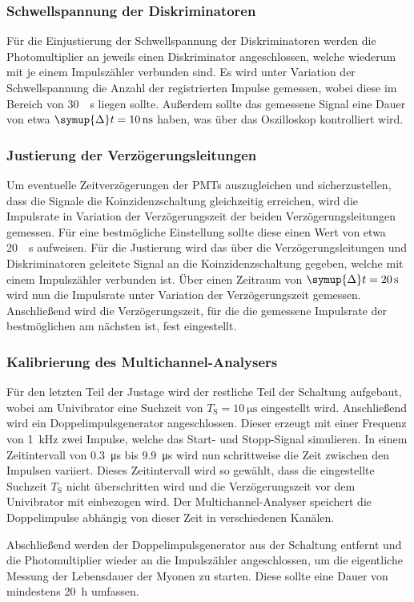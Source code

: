 \subsubsection{Schwellspannung der Diskriminatoren}

Für die Einjustierung der Schwellspannung der Diskriminatoren werden die Photomultiplier an jeweils einen Diskriminator angeschlossen,
welche wiederum mit je einem Impulszähler verbunden sind.
Es wird unter Variation der Schwellspannung die Anzahl der registrierten Impulse gemessen,
wobei diese im Bereich von \SI[per-mode=reciprocal]{30}{\per\second} liegen sollte.
Außerdem sollte das gemessene Signal eine Dauer von etwa $\symup{\Delta}t = \SI{10}{\nano\second}$ haben,
was über das Oszilloskop kontrolliert wird.


\subsubsection{Justierung der Verzögerungsleitungen}

Um eventuelle Zeitverzögerungen der \acp{PMT} auszugleichen und sicherzustellen,
dass die Signale die Koinzidenzschaltung gleichzeitig erreichen,
wird die Impulsrate in Variation der Verzögerungszeit der beiden Verzögerungsleitungen gemessen.
Für eine bestmögliche Einstellung sollte diese einen Wert von etwa \SI[per-mode=reciprocal]{20}{\per\second} aufweisen.
Für die Justierung wird das über die Verzögerungsleitungen und Diskriminatoren geleitete Signal an die Koinzidenzschaltung gegeben,
welche mit einem Impulszähler verbunden ist.
Über einen Zeitraum von $\symup{\Delta}t = \SI{20}{\second}$ wird nun die Impulsrate unter Variation der Verzögerungszeit gemessen.
Anschließend wird die Verzögerungszeit,
für die die gemessene Impulsrate der bestmöglichen am nächsten ist,
fest eingestellt.


\subsubsection{Kalibrierung des Multichannel-Analysers}

Für den letzten Teil der Justage wird der restliche Teil der Schaltung aufgebaut,
wobei am Univibrator eine Suchzeit von $T_\text{S} = \SI{10}{\micro\second}$ eingestellt wird.
Anschließend wird ein Doppelimpulsgenerator angeschlossen.
Dieser erzeugt mit einer Frequenz von \SI{1}{\kilo\hertz} zwei Impulse,
welche das Start- und Stopp-Signal simulieren.
In einem Zeitintervall von \SI{0.3}{\micro\second} bis \SI{9.9}{\micro\second} wird nun schrittweise die Zeit zwischen den Impulsen variiert.
Dieses Zeitintervall wird so gewählt, 
dass die eingestellte Suchzeit $T_\text{S}$ nicht überschritten wird und die Verzögerungszeit vor dem Univibrator mit einbezogen wird.
Der Multichannel-Analyser speichert die Doppelimpulse abhängig von dieser Zeit in verschiedenen Kanälen.

Abschließend werden der Doppelimpulsgenerator aus der Schaltung entfernt und die Photomultiplier wieder an die Impulszähler angeschlossen,
um die eigentliche Messung der Lebensdauer der Myonen zu starten.
Diese sollte eine Dauer von mindestens \SI{20}{\hour} umfassen.
